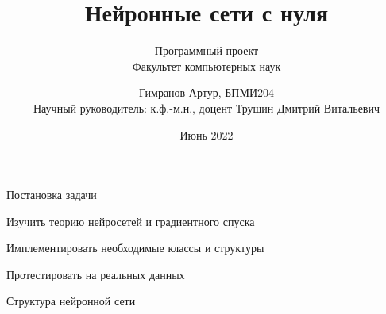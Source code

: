 \documentclass{beamer}
\title[Нейронные сети с нуля]{Нейронные сети с нуля}
\subtitle{Программный проект \\ Факультет компьютерных наук}
\author[Гимранов Артур БПМИ204]{Гимранов Артур, БПМИ204 \\ \scriptsize{Научный руководитель: к.ф.-м.н., доцент Трушин Дмитрий Витальевич}}
\institute[Высшая школа экономики]{Национальный исследовательский университет \\ «Высшая школа экономики» (Москва)}
\date{Июнь 2022}
\begin{document}

\frame[plain]{
    \titlepage
}	%

\begin{frame}{Постановка задачи}
\large{
    \begin{itemize}
        \large{
            \item Изучить теорию нейросетей и градиентного спуска \pause
            \item Имплементировать необходимые классы и структуры \pause
            \item Протестировать на реальных данных
        }
    \end{itemize}
}
\end{frame}

\begin{frame}{Структура нейронной сети}
    \begin{figure}[h]
    \end{figure} \pause
    \begin{figure}[h]
    \end{figure}
\end{frame}
\end{document}
